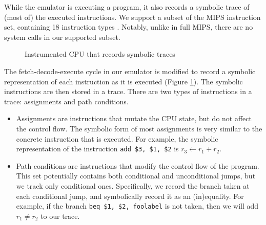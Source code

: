 \documentclass{llncs}
\begin{document}
While the emulator is executing a program, it also records a symbolic trace of (most of) the executed instructions. We support a subset of the MIPS instruction set, containing 18 instruction types \cite{mipsinstructions}. Notably, unlike in full MIPS, there are no system calls in our supported subset.

\begin{figure}
\caption{Instrumented CPU that records symbolic traces}
\label{cpucycle}
\end{figure}

The fetch-decode-execute cycle in our emulator is modified to record a symbolic representation of each instruction as it is executed (Figure \ref{cpucycle}). The symbolic instructions are then stored in a trace. There are two types of instructions in a trace: assignments and path conditions.
\begin{itemize}
\item Assignments are instructions that mutate the CPU state, but do not affect the control flow. The symbolic form of most assignments is very similar to the concrete instruction that is executed. For example, the symbolic representation of the instruction \lstinline{add $3, $1, $2} is $r_3 \gets r_1 + r_2$. 

\item Path conditions are instructions that modify the control flow of the program. This set potentially contains both conditional and unconditional jumps, but we track only conditional ones. Specifically, we record the branch taken at each conditional jump, and symbolically record it as an (in)equality. For example, if the branch \lstinline{beq $1, $2, foolabel} is not taken, then we will add $r_1 \neq r_2$ to our trace.
\end{itemize}
\end{document}
